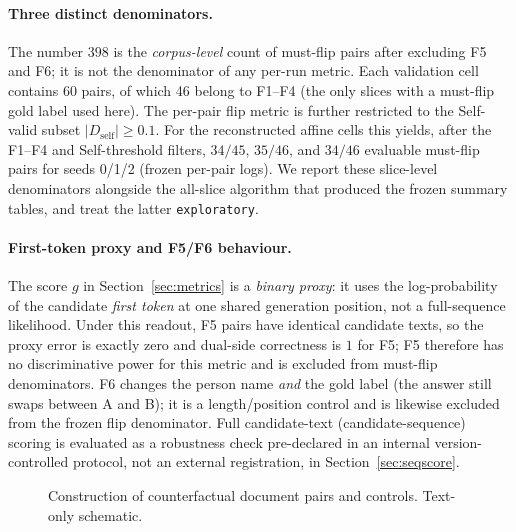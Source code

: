 \documentclass[11pt,twocolumn]{article}
\begin{document}
\paragraph{Three distinct denominators.} The number $398$ is the
\emph{corpus-level} count of must-flip pairs after excluding F5 and F6; it is
not the denominator of any per-run metric. Each validation cell contains 60
pairs, of which 46 belong to F1--F4 (the only slices with a must-flip gold
label used here). The per-pair flip metric is further restricted to the
Self-valid subset $|D_{\mathrm{self}}|\ge0.1$. For the reconstructed affine
cells this yields, after the F1--F4 and Self-threshold filters, $34/45$,
$35/46$, and $34/46$ evaluable must-flip pairs for seeds 0/1/2 (frozen
per-pair logs). We report these slice-level denominators alongside the
all-slice algorithm that produced the frozen summary tables, and treat the
latter \texttt{exploratory}.

\paragraph{First-token proxy and F5/F6 behaviour.} The score $g$ in
Section~\ref{sec:metrics} is a \emph{binary proxy}: it uses the log-probability
of the candidate \emph{first token} at one shared generation position, not a
full-sequence likelihood. Under this readout, F5 pairs have identical candidate
texts, so the proxy error is exactly zero and dual-side correctness is $1$ for
F5; F5 therefore has no discriminative power for this metric and is excluded
from must-flip denominators. F6 changes the person name \emph{and} the gold
label (the answer still swaps between A and B); it is a length/position control
and is likewise excluded from the frozen flip denominator. Full candidate-text
(candidate-sequence) scoring is evaluated as a robustness check pre-declared
in an internal version-controlled protocol, not an external registration, in
Section~\ref{sec:seqscore}.

\begin{figure}[t]
\centering
{}
\caption{Construction of counterfactual document pairs and controls. Text-only
schematic.}
\label{fig:f2}
\end{figure}
\end{document}
